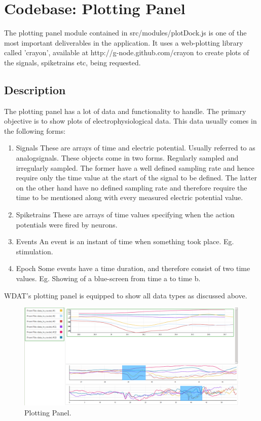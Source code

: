 \chapter{Codebase: Plotting Panel}

The plotting panel module contained in src/modules/plotDock.js is one
of the most important deliverables in the application.  It uses a
web-plotting library called 'crayon', available at 
http://g-node.github.com/crayon to create plots of the signals,
spiketrains etc, being requested.

\section{Description}

The plotting panel has a lot of data and functionality to handle.  The
primary objective is to show plots of electrophysiological data.  This
data usually comes in the following forms:

\begin{enumerate}
  \item{Signals}
  These are arrays of time and electric potential.  Usually referred
  to as analogsignals.  These objects come in two forms.  Regularly
  sampled and irregularly sampled.  The former have a well defined
  sampling rate and hence require only the time value at the start of
  the signal to be defined.  The latter on the other hand have no
  defined sampling rate and therefore require the time to be mentioned
  along with every measured electric potential value.

  \item{Spiketrains}
  These are arrays of time values specifying when the action
  potentials were fired by neurons.

  \item{Events}
  An event is an instant of time when something took place.  Eg.
  stimulation.

  \item{Epoch}
  Some events have a time duration, and therefore consist of two time
  values. Eg. Showing of a blue-screen from time a to time b.
\end{enumerate}

WDAT's plotting panel is equipped to show all data types as discussed
above. 

\begin{figure}[h!t]
  \centering
  \includegraphics[width=\textwidth]{src/images/wdat-plotting-panel.png}
  \caption{Plotting Panel.}
\end{figure}

